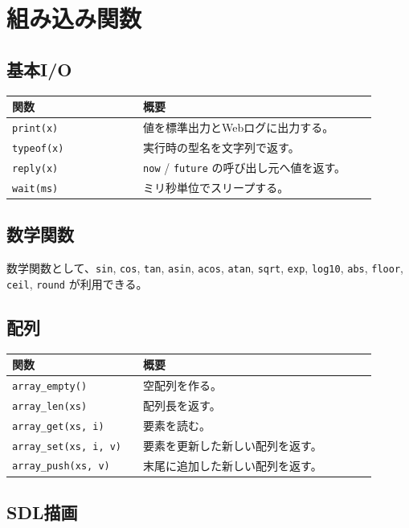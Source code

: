 \documentclass[11pt,a4paper,uplatex,dvipdfmx]{jsarticle}
\begin{document}
\section{組み込み関数}

\subsection{基本I/O}

\begin{longtable}{p{0.32\linewidth}p{0.58\linewidth}}
\toprule
関数 & 概要 \\
\midrule
\texttt{print(x)} & 値を標準出力とWebログに出力する。 \\
\texttt{typeof(x)} & 実行時の型名を文字列で返す。 \\
\texttt{reply(x)} & \texttt{now} / \texttt{future} の呼び出し元へ値を返す。 \\
\texttt{wait(ms)} & ミリ秒単位でスリープする。 \\
\bottomrule
\end{longtable}

\subsection{数学関数}

数学関数として、\texttt{sin}, \texttt{cos}, \texttt{tan}, \texttt{asin},
\texttt{acos}, \texttt{atan}, \texttt{sqrt}, \texttt{exp}, \texttt{log10},
\texttt{abs}, \texttt{floor}, \texttt{ceil}, \texttt{round} が利用できる。

\subsection{配列}

\begin{longtable}{p{0.32\linewidth}p{0.58\linewidth}}
\toprule
関数 & 概要 \\
\midrule
\texttt{array\_empty()} & 空配列を作る。 \\
\texttt{array\_len(xs)} & 配列長を返す。 \\
\texttt{array\_get(xs, i)} & 要素を読む。 \\
\texttt{array\_set(xs, i, v)} & 要素を更新した新しい配列を返す。 \\
\texttt{array\_push(xs, v)} & 末尾に追加した新しい配列を返す。 \\
\bottomrule
\end{longtable}

\subsection{SDL描画}
\end{document}
